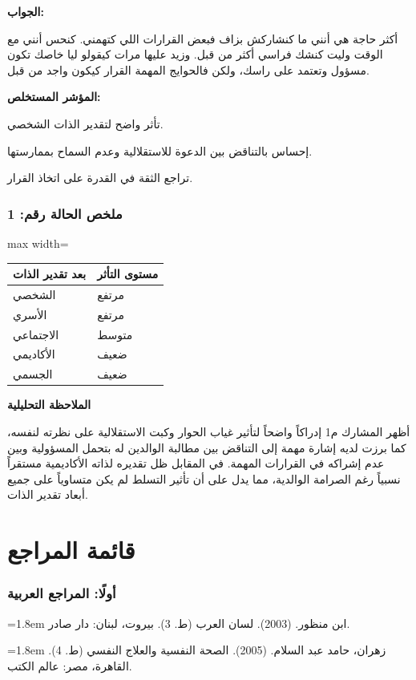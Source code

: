 \documentclass[12pt,oneside]{report}
\begin{document}
\noindent\textbf{الجواب:}\par
أكثر حاجة هي أنني ما كنشاركش بزاف فبعض القرارات اللي كتهمني. كنحس أنني مع الوقت وليت كنشك فراسي أكثر من قبل. وزيد عليها مرات كيقولو ليا خاصك تكون مسؤول وتعتمد على راسك، ولكن فالحوايج المهمة القرار كيكون واجد من قبل.

\noindent\textbf{المؤشر المستخلص:}\par
تأثر واضح لتقدير الذات الشخصي.

إحساس بالتناقض بين الدعوة للاستقلالية وعدم السماح بممارستها.

تراجع الثقة في القدرة على اتخاذ القرار.

\subsection*{ملخص الحالة رقم: 1}
\begin{table}[H]
\centering
\small
\renewcommand{\arraystretch}{1.3}
\setlength{\tabcolsep}{4pt}
\begin{adjustbox}{max width=\textwidth}
\begin{tabular}{p{3.8cm} p{9.6cm}}
\toprule
\textbf{بعد تقدير الذات} & \textbf{مستوى التأثر} \\
\midrule
الشخصي & مرتفع \\
الأسري & مرتفع \\
الاجتماعي & متوسط \\
الأكاديمي & ضعيف \\
الجسمي & ضعيف \\
\bottomrule
\end{tabular}
\end{adjustbox}
\end{table}
\noindent\textbf{الملاحظة التحليلية}\par
أظهر المشارك م1 إدراكاً واضحاً لتأثير غياب الحوار وكبت الاستقلالية على نظرته لنفسه، كما برزت لديه إشارة مهمة إلى التناقض بين مطالبة الوالدين له بتحمل المسؤولية وبين عدم إشراكه في القرارات المهمة. في المقابل ظل تقديره لذاته الأكاديمية مستقراً نسبياً رغم الصرامة الوالدية، مما يدل على أن تأثير التسلط لم يكن متساوياً على جميع أبعاد تقدير الذات.

\chapter*{قائمة المراجع}
\subsection*{أولًا: المراجع العربية}
\noindent\hangindent=1.8em ابن منظور. (2003). لسان العرب (ط. 3). بيروت، لبنان: دار صادر.\par\vspace{3pt}
\noindent\hangindent=1.8em زهران، حامد عبد السلام. (2005). الصحة النفسية والعلاج النفسي (ط. 4). القاهرة، مصر: عالم الكتب.\par\vspace{3pt}
\end{document}
